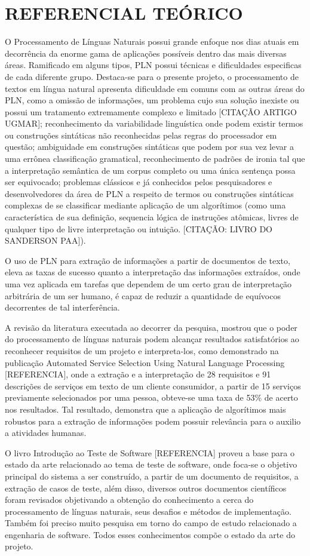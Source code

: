 \chapter{REFERENCIAL TEÓRICO}
\label{cap:referencial teórico}

O Processamento de Línguas Naturais possui grande enfoque nos dias atuais em decorrência da enorme gama de aplicações possíveis dentro das mais diversas áreas. Ramificado em alguns tipos, PLN possui técnicas e dificuldades especificas de cada diferente grupo. Destaca-se para o presente projeto, o processamento de textos em língua natural apresenta dificuldade em comuns com as outras áreas do PLN, como a omissão de informações, um problema cujo sua solução inexiste ou possui um tratamento extremamente complexo e limitado [CITAÇÃO ARTIGO UGMAR]; reconhecimento da variabilidade linguística onde podem existir termos ou construções sintáticas não reconhecidas pelas regras do processador em questão; ambiguidade em construções sintáticas que podem por sua vez levar a uma errônea classificação gramatical, reconhecimento de padrões de ironia tal que a interpretação semântica de um corpus completo ou uma única sentença possa ser equivocado; problemas clássicos e já conhecidos pelos pesquisadores e desenvolvedores da área de PLN a respeito de termos ou construções sintáticas complexas de se classificar mediante aplicação de um algorítimos (como uma característica de sua definição, sequencia lógica de instruções atômicas, livres de qualquer tipo de livre interpretação ou intuição. [CITAÇÃO: LIVRO DO SANDERSON PAA]).

O uso de PLN para extração de informações a partir de documentos de texto, eleva as taxas de sucesso quanto a interpretação das informações extraídos, onde uma vez aplicada em tarefas que dependem de um certo grau de interpretação arbitrária de um ser humano, é capaz de reduzir a quantidade de equívocos decorrentes de tal interferência.

A revisão da literatura executada ao decorrer da pesquisa, mostrou que o poder do processamento de línguas naturais podem alcançar resultados satisfatórios ao reconhecer requisitos de um projeto e interpreta-los, como demonstrado na publicação Automated Service Selection Using Natural Language Processing [REFERENCIA], onde a extração e a interpretação de 28 requisitos e 91 descrições de serviços em texto de um cliente consumidor, a partir de 15 serviços previamente selecionados por uma pessoa, obteve-se uma taxa de 53\% de acerto nos resultados. Tal resultado, demonstra que a aplicação de algorítimos mais robustos para a extração de informações podem possuir relevância para o auxilio a atividades humanas.

O livro Introdução ao Teste de Software [REFERENCIA] proveu a base para o estado da arte relacionado ao tema de teste de software, onde foca-se o objetivo principal do sistema a ser construído, a partir de um documento de requisitos, a extração de casos de teste, além disso, diversos outros documentos científicos foram revisados objetivando a obtenção do conhecimento a cerca do processamento de línguas naturais, seus desafios e métodos de implementação. Também foi preciso muito pesquisa em torno do campo de estudo relacionado a engenharia de software. Todos esses conhecimentos compõe o estado da arte do projeto.